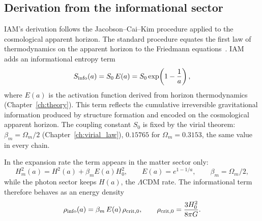 \subsection{Derivation from the informational sector}\label{sec:de_sinfo}
IAM's derivation follows the Jacobson--Cai--Kim procedure applied to the cosmological apparent horizon. The standard procedure equates the first
law of thermodynamics on the apparent horizon to the Friedmann equations~\cite{CaiKim2005}. IAM adds an informational entropy term
\begin{equation}
S_{\rm info}(a)=S_0\,E(a)=S_0\exp\!\left(1-\frac1a\right),\label{eq:de_sinfo}
\end{equation}
where $E(a)$ is the activation function derived from horizon thermodynamics (Chapter~\ref{ch:theory}). This term reflects the cumulative
irreversible gravitational information produced by structure formation and encoded on the cosmological apparent horizon. The coupling constant
$S_0$ is fixed by the virial theorem: $\beta_m=\Omega_m/2$ (Chapter~\ref{ch:virial_law}), $0.15765$ for $\Omega_m=0.3153$, the same value in
every chain. \prediction

In the expansion rate the term appears in the matter sector only:
\begin{equation}H_m^2(a)=H^2(a)+\beta_mE(a)H_0^2,\qquad E(a)=e^{1-1/a},\qquad\beta_m=\Omega_m/2,\label{part2:eq:Hm}\end{equation}
while the photon sector keeps $H(a)$, the $\Lambda$CDM rate. The informational term therefore behaves as an energy density
\begin{equation}\rho_{\rm info}(a)=\beta_m\,E(a)\,\rho_{\rm crit,0},\qquad\rho_{\rm crit,0}=\frac{3H_0^2}{8\pi G}.\label{eq:de_rhoinfo}\end{equation} \derived{}

